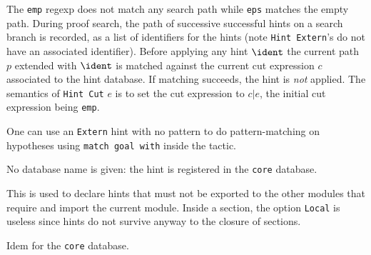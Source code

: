 \begin{itemize}
The \texttt{emp} regexp does not match any search path while
\texttt{eps} matches the empty path. During proof search, the path of
successive successful hints on a search branch is recorded, as a list of
identifiers for the hints (note \texttt{Hint Extern}'s do not have an
associated identifier). Before applying any hint $\ident$ the current
path $p$ extended with $\ident$ is matched against the current cut
expression $c$ associated to the hint database. If matching succeeds,
the hint is \emph{not} applied. The semantics of \texttt{Hint Cut} $e$
is to set the cut expression to $c | e$, the initial cut expression
being \texttt{emp}.




\end{itemize}

\Rem One can use an \texttt{Extern} hint with no pattern to do
pattern-matching on hypotheses using \texttt{match goal with} inside
the tactic.

\begin{Variants}
\item {}

  No database name is given: the hint is registered in the {\tt core}
    database.

\item {}

  This is used to declare hints that must not be exported to the other
  modules that require and import the current module. Inside a
  section, the option {\tt Local} is useless since hints do not
  survive anyway to the closure of sections.

\item {}

  Idem for the {\tt core} database.

\end{Variants}



